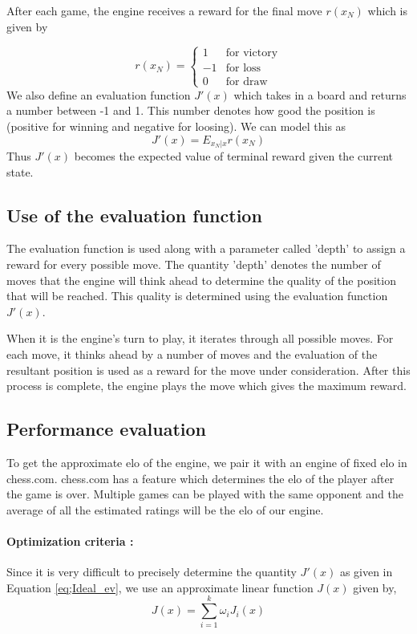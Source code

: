 \documentclass{article}
\begin{document}
After each game, the engine receives a reward for the final move $r(x_N)$ which is given by

\[
	r(x_N) =
	\begin{cases}
		1  & \text{for victory} \\
		-1 & \text{for loss}    \\
		0  & \text{for draw}
	\end{cases}
\]
We also define an evaluation function $J'(x)$ which takes in a board and returns a number between -1 and 1. This number denotes how good the position is (positive for winning and negative for loosing). We can model this as
\begin{equation}
	J'(x) = E_{x_N|x}r(x_N)
	\label{eq;Ideal_ev}
\end{equation}
Thus $J'(x)$ becomes the expected value of terminal reward given the current state.

\subsection{Use of the evaluation function}
The evaluation function is used along with a parameter called 'depth' to assign a reward for every possible move. The quantity 'depth' denotes the number of moves that the engine will think ahead to determine the quality of the position that will be reached. This quality is determined using the evaluation function $J'(x)$.

When it is the engine's turn to play, it iterates through all possible moves. For each move, it thinks ahead by a number of moves and the evaluation of the resultant position is used as a reward for the move under consideration. After this process is complete, the engine plays the move which gives the maximum reward.

\subsection{Performance evaluation}
To get the approximate elo of the engine, we pair it with an engine of fixed elo in chess.com. chess.com has a feature which determines the elo of the player after the game is over. Multiple games can be played with the same opponent and the average of all the estimated ratings will be the elo of our engine.

\paragraph{Optimization criteria :}
Since it is very difficult to precisely determine the quantity $J'(x)$ as given in Equation \ref{eq;Ideal_ev}, we use an approximate linear function $J(x)$ given by,
\begin{equation}
	J(x) = \sum_{i=1}^{k} \omega_i J_{i}(x)
	\label{eq;approx_ev}
\end{equation}
\end{document}
